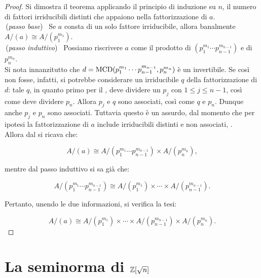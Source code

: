 \documentclass[11pt]{scrbook}
\begin{document}
    \begin{proof}
        Si dimostra il teorema applicando il principio di induzione su $n$,
        il numero di fattori irriducibili distinti che appaiono
        nella fattorizzazione di $a$. \\
        
        \,(\textit{passo base}) \, Se $a$ consta di un solo fattore irriducibile,
        allora banalmente $A/(a) \cong A/(p_1^{m_1})$. \\
        
        \,(\textit{passo induttivo}) \, Possiamo riscrivere $a$ come
        il prodotto di $(p_1^{m_1}\cdots p_{n-1}^{m_{n-1}})$ e di
        $p_n^{m_n}$. \\
        
        Si nota innanzitutto che $d = \operatorname{MCD}(p_1^{m_1}\cdots p_{n-1}^{m_{n-1}}, p_n^{m_n})$
        è un invertibile. Se così non fosse, infatti, si potrebbe
        considerare un irriducibile $q$ della fattorizzazione di $d$:
        tale $q$, in quanto primo per il ,
        deve dividere un $p_j$ con $1 \leq j \leq n-1$, così
        come deve dividere $p_n$. Allora $p_j$ e $q$ sono associati,
        così come $q$ e $p_n$. Dunque anche $p_j$ e $p_n$ sono associati.
        Tuttavia questo è un assurdo, dal momento che per ipotesi
        la fattorizzazione di $a$ include irriducibili distinti e
        non associati, \Lightning{}. \\
        
        Allora dal  si ricava che:
        
        \[ A/(a) \cong A/(p_1^{m_1}\cdots p_{n-1}^{m_{n-1}}) \times A/(p_n^{m_n}), \]
        
        \vskip 0.1in
        
        mentre dal passo induttivo si sa già che:
        
        \[ A/(p_1^{m_1}\cdots p_{n-1}^{m_{n-1}}) \cong A/(p_1^{m_1}) \times \cdots \times A/(p_{n-1}^{m_{n-1}}). \]
        
        \vskip 0.1in
        
        Pertanto, unendo le due informazioni, si verifica la tesi:
        
            \[ A/(a) \cong
            A/(p_1^{m_1}) \times \cdots \times A/(p_{n-1}^{m_{n-1}}) \times A/(p_n^{m_n}). \]
        
    \end{proof}

\section{La seminorma di \texorpdfstring{$\mathbb Z[\sqrt{n}]$}{Z[√n]}}
\end{document}
